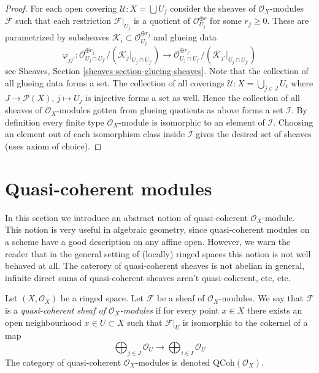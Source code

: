 \begin{proof}
For each open covering $\mathcal{U} : X = \bigcup U_j$ consider the
sheaves of $\mathcal{O}_X$-modules $\mathcal{F}$ such that each
restriction $\mathcal{F}|_{U_j}$ is a quotient of
$\mathcal{O}_{U_j}^{\oplus r}$ for some $r_j \geq 0$.
These are parametrized by subsheaves
$\mathcal{K}_i \subset \mathcal{O}_{U_j}^{\oplus r_j}$ and glueing
data
$$
\varphi_{jj'} :
\mathcal{O}_{U_j \cap U_{j'}}^{\oplus r_j}/
(\mathcal{K}_j|_{U_j \cap U_{j'}})
\longrightarrow
\mathcal{O}_{U_j \cap U_{j'}}^{\oplus r_{j'}}/
(\mathcal{K}_{j'}|_{U_j \cap U_{j'}})
$$
see Sheaves, Section \ref{sheaves-section-glueing-sheaves}.
Note that the collection of all glueing data forms a set.
The collection of all coverings $\mathcal{U} : X = \bigcup_{j \in J} U_i$
where $J \to \mathcal{P}(X)$, $j \mapsto U_j$ is injective forms a set as
well. Hence the collection of all sheaves of $\mathcal{O}_X$-modules
gotten from glueing quotients as above forms a set $\mathcal{I}$.
By definition every finite type $\mathcal{O}_X$-module
is isomorphic to an element of $\mathcal{I}$. Choosing an
element out of each isomorphism class inside $\mathcal{I}$
gives the desired set of sheaves (uses axiom of choice).
\end{proof}













\section{Quasi-coherent modules}
\label{section-quasi-coherent}

\noindent
In this section we introduce an abstract notion of
quasi-coherent $\mathcal{O}_X$-module. This notion is very
useful in algebraic geometry, since quasi-coherent modules
on a scheme have a good description on any affine open.
However, we warn the reader that
in the general setting of (locally) ringed spaces
this notion is not well behaved at all. The caterory of
quasi-coherent sheaves is not abelian in general, infinite
direct sums of quasi-coherent sheaves aren't quasi-coherent, etc, etc.

\begin{definition}
\label{definition-quasi-coherent}
Let $(X, \mathcal{O}_X)$ be a ringed space.
Let $\mathcal{F}$ be a sheaf of $\mathcal{O}_X$-modules.
We say that $\mathcal{F}$ is a {\it quasi-coherent
sheaf of $\mathcal{O}_X$-modules} if for every
point $x \in X$ there exists an open neighbourhood
$x\in U \subset X$ such that $\mathcal{F}|_U$
is isomorphic to the cokernel of a map
$$
\bigoplus\nolimits_{j \in J}
\mathcal{O}_U
\longrightarrow
\bigoplus\nolimits_{i \in I}
\mathcal{O}_U
$$
The category of quasi-coherent $\mathcal{O}_X$-modules
is denoted $\text{QCoh}(\mathcal{O}_X)$.
\end{definition}

